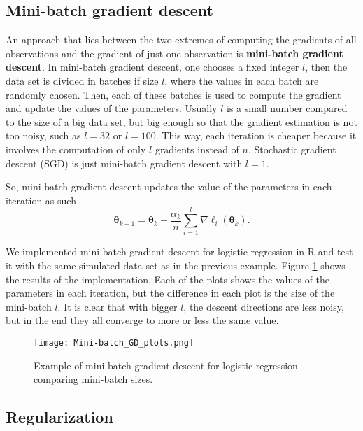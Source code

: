 \subsection{Mini-batch gradient descent}

An approach that lies between the two extremes of computing the gradients of all observations and the gradient of just one observation is \textbf{mini-batch gradient descent}. In mini-batch gradient descent, one chooses a fixed integer $l$, then the data set is divided in batches if size $l$, where the values in each batch are randomly chosen. Then, each of these batches is used to compute the gradient and update the values of the parameters. Usually $l$ is a small number compared to the size of a big data set, but big enough so that the gradient estimation is not too noisy, such as $l = 32$ or $l = 100$. This way, each iteration is cheaper because it involves the computation of only $l$ gradients instead of $n$. Stochastic gradient descent (SGD) is just mini-batch gradient descent with $l = 1$.

So, mini-batch gradient descent updates the value of the parameters in each iteration as such
\begin{equation}
  \boldsymbol{\theta}_{k+1} = \boldsymbol{\theta}_k - \frac{\alpha_k}{n} \sum_{i = 1}^l \nabla \ell_i(\boldsymbol{\theta}_k).
\end{equation}

We implemented mini-batch gradient descent for logistic regression in R and test it with the same simulated data set as in the previous example. Figure \ref{fig:Mini-batch_GD_plots} shows the results of the implementation. Each of the plots shows the values of the parameters in each iteration, but the difference in each plot is the size of the mini-batch $l$. It is clear that with bigger $l$, the descent directions are less noisy, but in the end they all converge to more or less the same value.

\begin{figure}[H]
    \centering
    \texttt{[image: Mini-batch\_GD\_plots.png]}
    \caption{Example of mini-batch gradient descent for logistic regression comparing mini-batch sizes.}
    \label{fig:Mini-batch_GD_plots}
\end{figure}


\subsection{Regularization}

